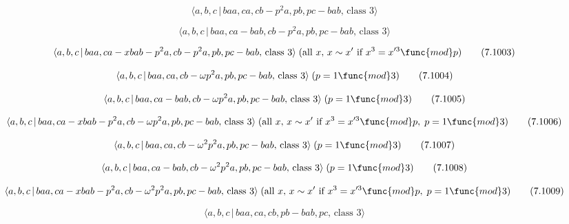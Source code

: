 \documentclass[10pt]{article}
\begin{document}
\begin{equation}
\langle a,b,c\,|\,baa,ca,cb-p^2a,pb,pc-bab,\,\text{class }3\rangle 
\tag{7.1001}
\end{equation}

\begin{equation}
\langle a,b,c\,|\,baa,ca-bab,cb-p^2a,pb,pc-bab,\,\text{class }3\rangle 
\tag{7.1002}
\end{equation}

\begin{equation}
\langle a,b,c\,|\,baa,ca-xbab-p^{2}a,cb-p^{2}a,pb,pc-bab,\,\text{class }%
3\rangle \;(\text{all }x,\,x \sim x^{\prime }\text{ if }x^3=x^{\prime 3}%
\func{mod}p)  \tag{7.1003}
\end{equation}

\begin{equation}
\langle a,b,c\,|\,baa,ca,cb-\omega p^{2}a,pb,pc-bab,\,\text{class }3\rangle
\;(p=1\func{mod}3)  \tag{7.1004}
\end{equation}

\begin{equation}
\langle a,b,c\,|\,baa,ca-bab,cb-\omega p^{2}a,pb,pc-bab,\,\text{class }%
3\rangle \;(p=1\func{mod}3)  \tag{7.1005}
\end{equation}

\begin{equation}
\langle a,b,c\,|\,baa,ca-xbab-p^{2}a,cb-\omega p^{2}a,pb,pc-bab,\,\text{%
class }3\rangle \;(\text{all }x,\,x \sim x^{\prime }\text{ if }x^3=x^{\prime
3}\func{mod}p,\;p=1\func{mod}3)  \tag{7.1006}
\end{equation}

\begin{equation}
\langle a,b,c\,|\,baa,ca,cb-\omega ^{2}p^{2}a,pb,pc-bab,\,\text{class }%
3\rangle \;(p=1\func{mod}3)  \tag{7.1007}
\end{equation}

\begin{equation}
\langle a,b,c\,|\,baa,ca-bab,cb-\omega ^{2}p^{2}a,pb,pc-bab,\,\text{class }%
3\rangle \;(p=1\func{mod}3)  \tag{7.1008}
\end{equation}

\begin{equation}
\langle a,b,c\,|\,baa,ca-xbab-p^{2}a,cb-\omega ^{2}p^{2}a,pb,pc-bab,\,\text{%
class }3\rangle \;(\text{all }x,\,x \sim x^{\prime }\text{ if }x^3=x^{\prime
3}\func{mod}p,\;p=1\func{mod}3)  \tag{7.1009}
\end{equation}

\begin{equation}
\langle a,b,c\,|\,baa,ca,cb,pb-bab,pc,\,\text{class }3\rangle  \tag{7.1010}
\end{equation}
\end{document}

